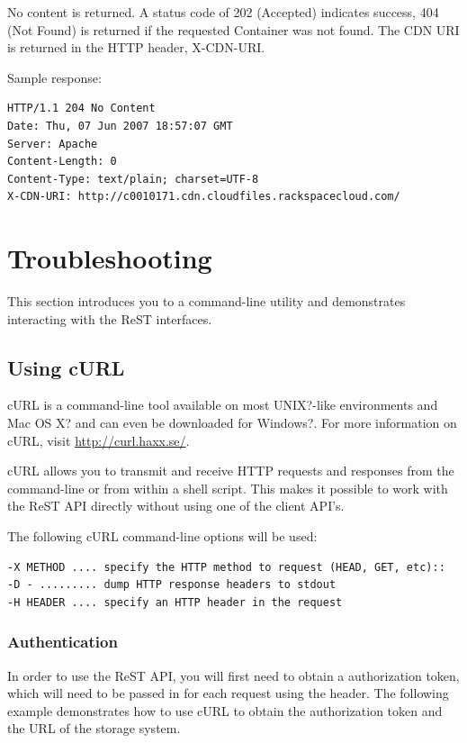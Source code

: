 \documentclass[letterpaper,10pt,english]{manual}
\begin{document}
No content is returned. A status code of 202 (Accepted) indicates
success, 404 (Not Found) is returned if the requested Container was
not found.  The CDN URI is returned in the HTTP header, X-CDN-URI.

Sample response:

\begin{Verbatim}[commandchars=@\[\]]
HTTP/1.1 204 No Content
Date: Thu, 07 Jun 2007 18:57:07 GMT
Server: Apache
Content-Length: 0
Content-Type: text/plain; charset=UTF-8
X-CDN-URI: http://c0010171.cdn.cloudfiles.rackspacecloud.com/
\end{Verbatim}


\chapter{Troubleshooting}

This section introduces you to a command-line utility and demonstrates
interacting with the ReST interfaces.


\section{Using cURL}

cURL is a command-line tool available on most UNIX?-like environments and
Mac OS X? and can even be downloaded for Windows?.  For more information
on cURL, visit \href{http://curl.haxx.se/}{http://curl.haxx.se/}.

cURL allows you to transmit and receive HTTP requests and responses from
the command-line or from within a shell script. This makes it possible
to work with the ReST API directly without using one of the client API's.

The following cURL command-line options will be used:

\begin{Verbatim}[commandchars=@\[\]]
-X METHOD .... specify the HTTP method to request (HEAD, GET, etc)::
-D - ......... dump HTTP response headers to stdout
-H HEADER .... specify an HTTP header in the request
\end{Verbatim}


\subsection{Authentication}

In order to use the ReST API, you will first need to obtain a
authorization token, which will need to be passed in for each request
using the  header. The following example demonstrates
how to use cURL to obtain the authorization token and the URL of the
storage system.
\end{document}
